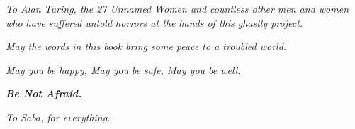 \newpage
\thispagestyle{empty}

\vspace*{\fill}

\begin{center}
\vspace{2cm}

\begin{minipage}{0.7\textwidth}
\centering

\textit{To Alan Turing, the 27 Unnamed Women and countless other men and women who have suffered untold horrors at the hands of this ghastly project.}

\vspace{1.5cm}

\textit{May the words in this book bring some peace to a troubled world.}

\vspace{0.8cm}

\textit{May you be happy, May you be safe, May you be well.}

\vspace{1.2cm}

{\large\textbf{\textit{Be Not Afraid.}}}

\vspace{3cm}

\textit{To Saba, for everything.}

\end{minipage}
\end{center}

\vspace*{\fill}

\newpage
